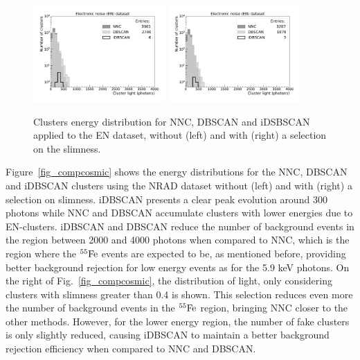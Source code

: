 \documentclass[a4paper,11pt]{article}
\begin{document}
\begin{figure}[ht]
\centering
\includegraphics[width=0.45\textwidth]{LigthYield_No_wo.pdf}
\includegraphics[width=0.45\textwidth]{LigthYield_No_Slim.pdf}
\caption{Clusters energy distribution for NNC, DBSCAN and iDSBSCAN applied to the EN dataset, without (left) and with (right) a selection on the slimness.}
\label{fig_compnoise}
\end{figure}


Figure~\ref{fig_compcosmic} shows the energy distributions for the NNC, DBSCAN and iDBSCAN clusters using the NRAD dataset without (left) and with (right) a selection on slimness.
iDBSCAN presents a clear peak evolution around 300 photons while NNC and DBSCAN accumulate clusters with lower energies due to EN-clusters.
iDBSCAN and DBSCAN reduce the number of background events in the region between 2000 and 4000 photons when compared to NNC, which is the region where the $\rm ^{55}Fe$ events are expected to be, as mentioned before, providing better background rejection for low energy events as for the 5.9 keV photons.
On the right of Fig.~\ref{fig_compcosmic}, the distribution of light, only considering clusters with slimness greater than 0.4 is shown. This selection reduces even more the number of background events in the $\rm ^{55}Fe$ region, bringing NNC closer to the other methods. 
However, for the lower energy region, the number of fake clusters is only slightly reduced, causing iDBSCAN to maintain a better background rejection efficiency when compared to NNC and DBSCAN.
\end{document}
